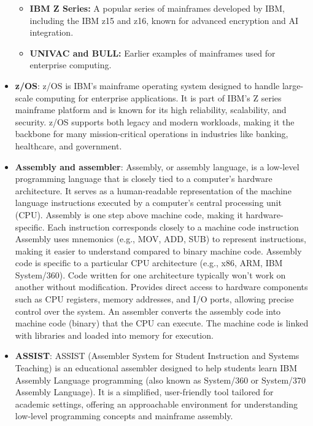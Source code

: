\documentclass{report}
\begin{document}
\begin{itemize}
\begin{itemize}
                \item \textbf{IBM Z Series:} A popular series of mainframes developed by IBM, including the IBM z15 and z16, known for advanced encryption and AI integration.
                \item \textbf{UNIVAC and BULL:} Earlier examples of mainframes used for enterprise computing.
            \end{itemize}
        \item \textbf{z/OS}: z/OS is IBM's mainframe operating system designed to handle large-scale computing for enterprise applications. It is part of IBM's Z series mainframe platform and is known for its high reliability, scalability, and security. z/OS supports both legacy and modern workloads, making it the backbone for many mission-critical operations in industries like banking, healthcare, and government.
        \item \textbf{Assembly and assembler}: Assembly, or assembly language, is a low-level programming language that is closely tied to a computer's hardware architecture. It serves as a human-readable representation of the machine language instructions executed by a computer's central processing unit (CPU).
            \bigbreak \noindent 
            Assembly is one step above machine code, making it hardware-specific. Each instruction corresponds closely to a machine code instruction
            \bigbreak \noindent 
            Assembly uses mnemonics (e.g., MOV, ADD, SUB) to represent instructions, making it easier to understand compared to binary machine code.
            \bigbreak \noindent 
            Assembly code is specific to a particular CPU architecture (e.g., x86, ARM, IBM System/360). Code written for one architecture typically won't work on another without modification.
            \bigbreak \noindent 
            Provides direct access to hardware components such as CPU registers, memory addresses, and I/O ports, allowing precise control over the system.
            \bigbreak \noindent 
            An assembler converts the assembly code into machine code (binary) that the CPU can execute. The machine code is linked with libraries and loaded into memory for execution.
        \item \textbf{ASSIST}: ASSIST (Assembler System for Student Instruction and Systems Teaching) is an educational assembler designed to help students learn IBM Assembly Language programming (also known as System/360 or System/370 Assembly Language). It is a simplified, user-friendly tool tailored for academic settings, offering an approachable environment for understanding low-level programming concepts and mainframe assembly.

\end{itemize}
\end{document}
